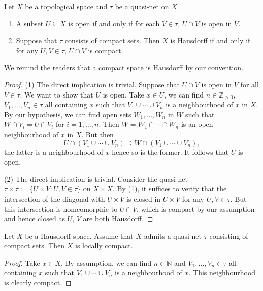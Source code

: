 \begin{lemma}
    Let $X$ be a topological space and $\tau$ be a quasi-net on $X$. 
    \begin{enumerate}
        \item A subset $U\subseteq X$ is open if and only if for each $V\in \tau$, $U\cap V$ is open in $V$.
        \item Suppose that $\tau$ consists of compact sets. Then $X$ is Hausdorff if and only if for any $U,V\in \tau$, $U\cap V$ is compact.
    \end{enumerate}
\end{lemma}
We remind the readers that a compact space is Hausdorff by our convention.
\begin{proof}
    (1) The direct implication is trivial. Suppose that $U\cap V$ is open in $V$ for all $V\in \tau$. We want to show that $U$ is open. Take $x\in U$, we can find $n\in \mathbb{Z}_{>0}$, $V_1,\ldots,V_n\in \tau$ all containing $x$ such that $V_1\cup \cdots \cup V_n$ is a neighbourhood of $x$ in $X$. By our hypothesis, we can find open sets $W_1,\ldots,W_n$ in $W$ such that $W\cap V_i=U\cap V_i$ for $i=1,\ldots,n$. Then $W=W_1\cap \cdots\cap W_n$ is an open neighbourhood of $x$ in $X$. But then
    \[
        U\cap (V_1\cup\cdots\cup V_n)\supseteq W\cap   (V_1\cup\cdots\cup V_n),
    \]
    the latter is a neighbourhood of $x$ hence so is the former. It follows that $U$ is open.

    (2) The direct implication is trivial. Consider the quasi-net $\tau\times\tau:=\{U\times V: U,V\in \tau\}$ on $X\times X$. 
    By (1), it suffices to verify that the intersection of the diagonal with $U\times V$ is closed in $U\times V$  for any $U,V\in \tau$. But this intersection is homeomorphic to $U\cap V$, which is compact by our assumption and hence closed as $U$, $V$ are both Hausdorff.
\end{proof}

\begin{lemma}\label{lma-quasinetimplyloccpt}
    Let $X$ be a Hausdorff space. Assume that $X$ admits a quasi-net $\tau$ consisting of compact sets. Then $X$ is locally compact.
\end{lemma}
\begin{proof}
    Take $x\in X$. By assumption, we can find $n\in \mathbb{N}$ and $V_1,\ldots,V_n\in \tau$ all containing $x$ such that $V_1\cup\cdots\cup V_n$ is a neighbourhood of $x$. This neighbourhood is clearly compact.
\end{proof}

